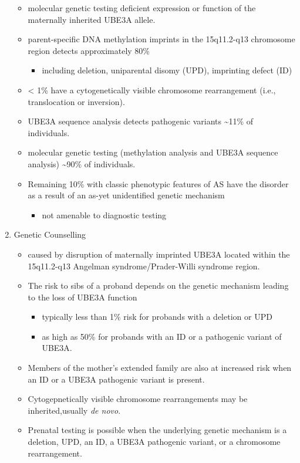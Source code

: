 \documentclass[12pt]{scrartcl}
\begin{document}
\begin{enumerate}
\begin{itemize}
\item molecular genetic testing deficient expression or function of the
maternally inherited UBE3A allele.
\item parent-specific DNA methylation imprints in the 15q11.2-q13 chromosome region detects approximately 80\%
\begin{itemize}
\item including deletion, uniparental disomy (UPD), imprinting defect (ID)
\end{itemize}
\item \textless{} 1\% have a cytogenetically visible chromosome rearrangement (i.e., translocation or inversion).
\item UBE3A sequence analysis detects pathogenic variants \textasciitilde{}11\% of individuals.
\item molecular genetic testing (methylation analysis and UBE3A sequence
analysis) \textasciitilde{}90\% of individuals.
\item Remaining 10\% with classic phenotypic features of AS have the
disorder as a result of an as-yet unidentified genetic mechanism
\begin{itemize}
\item not amenable to diagnostic testing
\end{itemize}
\end{itemize}
\item Genetic Counselling
\label{sec:orgea13a99}
\begin{itemize}
\item caused by disruption of maternally imprinted UBE3A located within
the 15q11.2-q13 Angelman syndrome/Prader-Willi syndrome region.
\item The risk to sibs of a proband depends on the genetic mechanism
leading to the loss of UBE3A function
\begin{itemize}
\item typically less than 1\% risk for probands with a deletion or UPD
\item as high as 50\% for probands with an ID or a pathogenic variant of UBE3A.
\end{itemize}
\item Members of the mother's extended family are also at increased risk
when an ID or a UBE3A pathogenic variant is present.
\item Cytogepnetically visible chromosome rearrangements may be inherited,usually \emph{de novo}.
\item Prenatal testing is possible when the underlying genetic mechanism
is a deletion, UPD, an ID, a UBE3A pathogenic variant, or a
chromosome rearrangement.
\end{itemize}
\end{enumerate}
\end{document}
